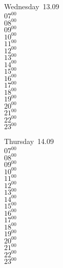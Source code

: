 \documentclass[11pt, a4paper]{book}\usepackage[]{graphicx}\usepackage[]{color}
\begin{document}
\begin{weekdaybox}
  Wednesday~13.09\\
  { 
  \vfill
  $07^{00}$\\
$08^{00}$\\
$09^{00}$\\
$10^{00}$\\
$11^{00}$\\
$12^{00}$\\
$13^{00}$\\
$14^{00}$\\
$15^{00}$\\
$16^{00}$\\
$17^{00}$\\
$18^{00}$\\
$19^{00}$\\
$20^{00}$\\
$21^{00}$\\
$22^{00}$\\
$23^{00}$\\
  }
\end{weekdaybox}
\clearpage
\begin{headerbox}
\end{headerbox}
\begin{weekdaybox}
  Thursday~14.09\\
  { 
  \vfill
  $07^{00}$\\
$08^{00}$\\
$09^{00}$\\
$10^{00}$\\
$11^{00}$\\
$12^{00}$\\
$13^{00}$\\
$14^{00}$\\
$15^{00}$\\
$16^{00}$\\
$17^{00}$\\
$18^{00}$\\
$19^{00}$\\
$20^{00}$\\
$21^{00}$\\
$22^{00}$\\
$23^{00}$\\
  }
\end{weekdaybox} 
\end{document}
